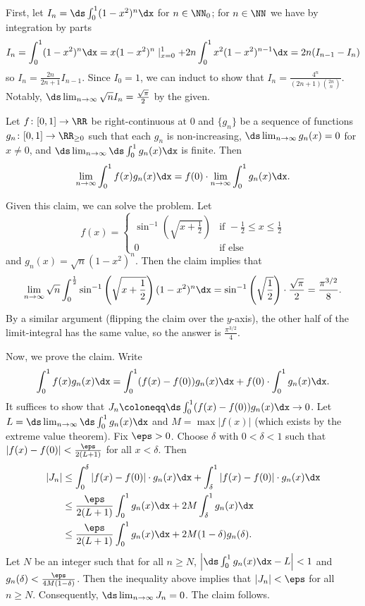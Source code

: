 First, let $I_n=\ds\int_0^1(1-x^2)^n\dx$ for $n\in\NN_0$; for $n\in\NN$ we have by integration by parts
	\[
		I_n=\int_0^1(1-x^2)^n\dx=x(1-x^2)^n\mid_{x=0}^1+2n\int_0^1 x^2(1-x^2)^{n-1}\dx=2n(I_{n-1}-I_n)
	\]
	so $I_n=\frac{2n}{2n+1}I_{n-1}$. Since $I_0=1$, we can induct to show that $I_n=\frac{4^n}{(2n+1)\binom{2n}{n}}$. Notably, $\ds\lim_{n\to\infty}\sqrt{n} I_n=\frac{\sqrt{\pi}}{2}$ by the given.
	\begin{claim}
		Let $f\colon[0,1]\to\RR$ be right-continuous at $0$ and $\{g_n\}$ be a sequence of functions $g_n\colon[0,1]\to\RR_{\geq0}$ such that each $g_n$ is non-increasing, $\ds\lim_{n\to\infty}g_n(x)=0$ for $x\neq0$, and $\ds\lim_{n\to\infty}\ds\int_0^1 g_n(x) \dx$ is finite. Then
		\[
			\lim_{n\to\infty}\int_0^1 f(x)g_n(x) \dx = f(0)\cdot\lim_{n\to\infty}\int_0^1 g_n(x) \dx.
		\]
	\end{claim}
	Given this claim, we can solve the problem. Let
	\[
		f(x)=
		\begin{cases}
			\sin^{-1}\left(\sqrt{x+\frac{1}{2}}\right) & \text{if }-\frac{1}{2}\leq x\leq\frac{1}{2} \\
			0 & \text{if else}
		\end{cases}
	\]
	and $g_n(x)=\sqrt{n}(1-x^2)^n$. Then the claim implies that
	\[
		\lim_{n\to\infty}\sqrt{n}\int_0^{\frac{1}{2}}\sin^{-1}\left(\sqrt{x+\frac{1}{2}}\right)(1-x^2)^n \dx=\sin^{-1}\left(\sqrt{\frac{1}{2}}\right)\cdot\frac{\sqrt{\pi}}{2}=\frac{\pi^{3/2}}{8}.
	\]
	By a similar argument (flipping the claim over the $y$-axis), the other half of the limit-integral has the same value, so the answer is $\frac{\pi^{3/2}}{4}$.
	
	Now, we prove the claim. Write
	\[
		\int_0^1 f(x)g_n(x) \dx = \int_0^1 (f(x)-f(0))g_n(x) \dx + f(0)\cdot \int_0^1 g_n(x) \dx.
	\]
	It suffices to show that $J_n\coloneqq\ds\int_0^1(f(x)-f(0))g_n(x) \dx\to0$. Let $L=\ds\lim_{n\to\infty}\ds\int_0^1 g_n(x) \dx$ and $M=\max|f(x)|$ (which exists by the extreme value theorem). Fix $\eps>0$. Choose $\delta$ with $0<\delta<1$ such that $|f(x)-f(0)|<\frac{\eps}{2(L+1)}$ for all $x<\delta$. Then
	\begin{align*}
		|J_n| &\leq \int_0^\delta |f(x)-f(0)|\cdot g_n(x) \dx + \int_\delta^1 |f(x)-f(0)|\cdot g_n(x) \dx \\
		&\leq \frac{\eps}{2(L+1)}\int_0^1 g_n(x) \dx + 2M\int_\delta^1 g_n(x) \dx \\
		&\leq \frac{\eps}{2(L+1)}\int_0^1 g_n(x) \dx + 2M(1-\delta)g_n(\delta).
	\end{align*}
	Let $N$ be an integer such that for all $n\geq N$, $\left|\ds\int_0^1 g_n(x) \dx-L\right|<1$ and $g_n(\delta)<\frac{\eps}{4M(1-\delta)}$. Then the inequality above implies that $|J_n|<\eps$ for all $n\geq N$. Consequently, $\ds\lim_{n\to\infty}J_n=0$. The claim follows.
	
